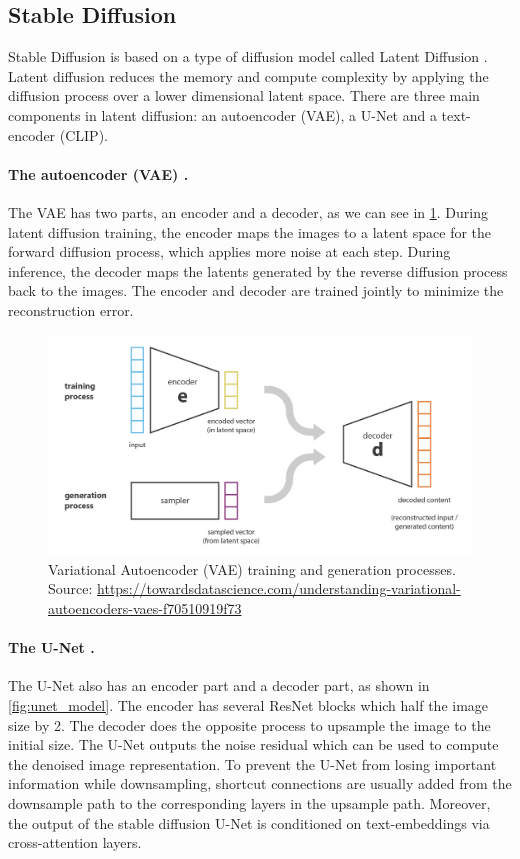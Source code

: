 \subsection{Stable Diffusion}

Stable Diffusion is based on a type of diffusion model called Latent Diffusion \cite{rombach2021highresolution}. Latent diffusion reduces the memory and compute complexity by applying the diffusion process over a lower dimensional latent space. There are three main components in latent diffusion: an autoencoder (VAE), a U-Net and a text-encoder (CLIP).

\paragraph{The autoencoder (VAE) \cite{kingma2013auto}.} The VAE has two parts, an encoder and a decoder, as we can see in \cref{fig:vae}. During latent diffusion training, the encoder maps the images to a latent space for the forward diffusion process, which applies more noise at each step. During inference, the decoder maps the latents generated by the reverse diffusion process back to the images. The encoder and decoder are trained jointly to minimize the reconstruction error.

\begin{figure}[ht]
    \centering
    \includegraphics[width=\linewidth]{images/diffusion/vae.png}
    \caption{Variational Autoencoder (VAE) training and generation processes. Source: \url{https://towardsdatascience.com/understanding-variational-autoencoders-vaes-f70510919f73}}
    \label{fig:vae}
\end{figure}

\paragraph{The U-Net \cite{ronneberger2015u}.} The U-Net also has an encoder part and a decoder part, as shown in \cref{fig:unet_model}. The encoder has several ResNet blocks which half the image size by 2. The decoder does the opposite process to upsample the image to the initial size. The U-Net outputs the noise residual which can be used to compute the denoised image representation. To prevent the U-Net from losing important information while downsampling, shortcut connections are usually added from the downsample path to the corresponding layers in the upsample path. Moreover, the output of the stable diffusion U-Net is conditioned on text-embeddings via cross-attention layers.

